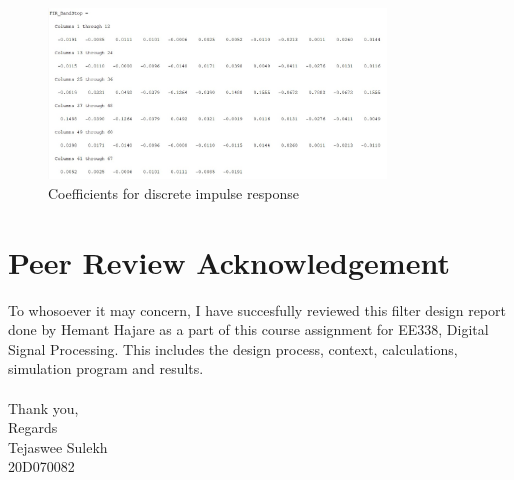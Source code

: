 \documentclass{scrartcl}
\begin{document}
\begin{figure}[ht!]
    \centering
    \includegraphics[width = 0.8\textwidth]{Graphics/Bandstopcol.jpeg}
    \caption{Coefficients for discrete impulse response}
\end{figure}
\newpage

\section{Peer Review Acknowledgement}

To whosoever it may concern, I have succesfully reviewed this filter design report done by Hemant Hajare as a part of this course assignment for EE338, Digital Signal Processing. This includes the design process, context, calculations, simulation program and results.\\
\\
Thank you,\\
Regards\\
Tejaswee Sulekh\\
20D070082\\
\end{document}
